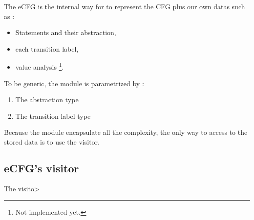 The \gls{eCFG} is the internal way for \flatac to represent the  \gls{CFG} plus our own datas such as :
\begin{itemize}
	\item Statements and their abstraction,
	\item each transition label,
	\item value analysis \footnote{Not implemented yet.}.
\end{itemize}

To be generic, the module is parametrized by :
\begin{enumerate}
	\item The abstraction type
	\item The transition label type
\end{enumerate}


Because the module encapsulate all the complexity, the only way to access to the stored data is to use the visitor.

\subsection{eCFG's visitor}
The visito>
